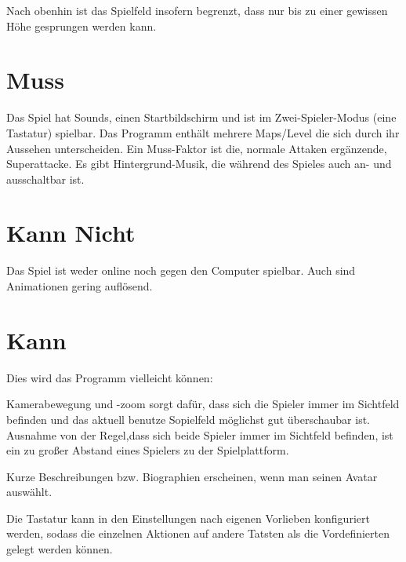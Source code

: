 \documentclass[11pt]{article}
\newcommand{\paragraphspace}{0.3cm}
\begin{document}
    \noindent
    Nach obenhin ist das Spielfeld insofern begrenzt, dass nur bis zu einer gewissen H\"ohe gesprungen werden kann.

    \section{Muss}\label{sec:muss}
    Das Spiel hat Sounds, einen Startbildschirm und ist im \glqq Zwei-Spieler-Modus\grqq{} (eine Tastatur) spielbar.
    Das Programm enth\"alt mehrere Maps/Level die sich durch ihr Aussehen unterscheiden.
    Ein Muss-Faktor ist die, normale Attaken erg\"anzende, Superattacke.
    Es gibt Hintergrund-Musik, die w\"ahrend des Spieles auch an- und ausschaltbar ist.

    \section{Kann Nicht}\label{sec:kann-nicht}
    Das Spiel ist weder online noch gegen den Computer spielbar.
    Auch sind Animationen gering aufl\"osend.

    \section{Kann}\label{sec:kann}
    Dies wird das Programm vielleicht k\"onnen:
    \vspace{\paragraphspace}

    \noindent
    Kamerabewegung und -zoom sorgt daf\"ur, dass sich die Spieler immer im Sichtfeld befinden und das aktuell benutze Sopielfeld m\"oglichst
    gut \"uberschaubar ist. Ausnahme von der Regel,dass sich beide Spieler immer im Sichtfeld befinden, ist ein zu gro\ss{}er Abstand eines Spielers zu der
    Spielplattform.
    \vspace{\paragraphspace}

    \noindent
    Kurze Beschreibungen bzw. Biographien erscheinen, wenn man seinen Avatar ausw\"ahlt.
    \vspace{\paragraphspace}

    \noindent
    Die Tastatur kann in den Einstellungen nach eigenen Vorlieben konfiguriert werden, sodass die
    einzelnen Aktionen auf andere Tatsten als die Vordefinierten gelegt werden k\"onnen.
\end{document}

